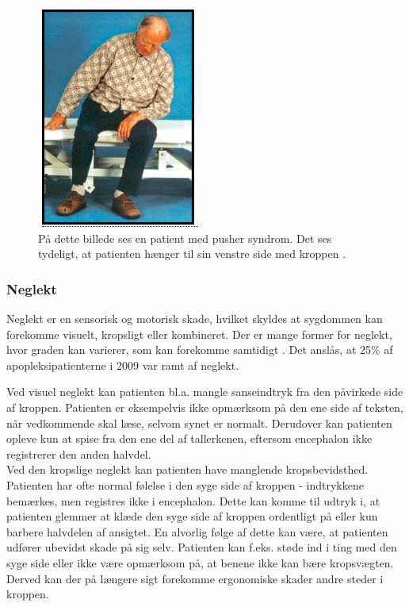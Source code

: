 \begin{figure}[H]
	\centering
	\includegraphics[scale=0.9]{figures/bProblemanalyse/Pusher.png}
	\caption{På dette billede ses en patient med pusher syndrom. Det ses tydeligt, at patienten hænger til sin venstre side med kroppen \cite{Karnath2003}.}
	\label{pusher}
\end{figure}

\subsubsection{Neglekt}
Neglekt er en sensorisk og motorisk skade, hvilket skyldes at sygdommen kan forekomme visuelt, kropsligt eller kombineret.  Der er mange former for neglekt, hvor graden kan varierer, som kan forekomme samtidigt \cite{Sundhed.dk2014}. Det anslås, at 25\% af apopleksipatienterne i 2009 var ramt af neglekt. \cite{Sundhedsstyrelsen2009}

Ved visuel neglekt kan patienten bl.a. mangle sanseindtryk fra den påvirkede side af kroppen. Patienten er eksempelvis ikke opmærksom på den ene side af teksten, når vedkommende skal læse, selvom synet er normalt. Derudover kan patienten opleve kun at spise fra den ene del af tallerkenen, eftersom encephalon ikke registrerer den anden halvdel. \cite{Sundhed.dk2014}\\
Ved den kropslige neglekt kan patienten have manglende kropsbevidsthed. Patienten har ofte normal følelse i den syge side af kroppen - indtrykkene bemærkes, men registres ikke i encephalon. Dette kan komme til udtryk i, at patienten glemmer at klæde den syge side af kroppen ordentligt på eller kun barbere halvdelen af ansigtet. En alvorlig følge af dette kan være, at patienten udfører ubevidst skade på sig selv. Patienten kan f.eks. støde ind i ting med den syge side eller ikke være opmærksom på, at benene ikke kan bære kropsvægten. Derved kan der på længere sigt forekomme ergonomiske skader andre steder i kroppen. \cite{Kruuse2015a}

